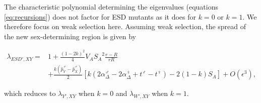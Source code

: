 \documentclass[10pt,letterpaper]{article}
\begin{document}
The characteristic polynomial determining the eigenvalues (equations \ref{eq:recursions}) does not factor for ESD mutants as it does for $k=0$ or $k=1$. 
We therefore focus on weak selection here. 
Assuming weak selection, the spread of the new sex-determining region is given by 

\begin{equation}
\begin{split}
\lambda_{ESD',XY} =& 1 + \frac{(1-2k)^2}{4}V_{A}{S_{A}}^2\frac{r-R}{r R} \\
&+\frac{k(\hat{p}^\male_Y-\hat{p}^\male_X)}{2}\left[ k \left(2\alpha_{\Delta}^\male-2\alpha_{\Delta}^\female+t^\male-t^\female \right) -2(1-k)S_{A}\right]+O\left(\epsilon^3\right),
\end{split}
\label{eq:lambda_ESD_k}
\end{equation}

\noindent
which reduces to $\lambda_{Y',XY}$ when $k=0$ and $\lambda_{W',XY}$ when $k=1$. 
\end{document}
